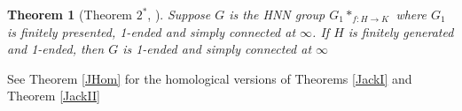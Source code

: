 \documentclass[12pt]{article}
\newtheorem{theorem}{Theorem}[subsection]
\newenvironment{proof}{\addvspace{12pt}\noindent{\bf Proof:}}{
$\Box$\par\addvspace{12pt}}
\begin{document}
\begin{theorem} [Theorem $2^\ast$, \cite{J82b}]\label{JackIIi} 
Suppose $G$ is the HNN group $G_1 \ast _{f:H\to K}$ where $G_1$ is finitely presented, 1-ended and simply connected at $\infty$. If $H$ is finitely generated and 1-ended, then $G$ is 1-ended and simply connected at $\infty$
\end{theorem}

See Theorem \ref{JHom} for the homological versions of Theorems \ref{JackI} and Theorem \ref{JackII}



\end{document}
